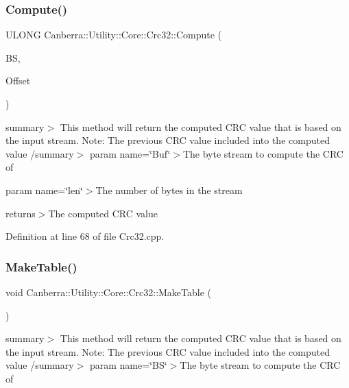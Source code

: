 \subsubsection{\texorpdfstring{Compute()}{Compute()}}
{\footnotesize\ttfamily U\+L\+O\+NG Canberra\+::\+Utility\+::\+Core\+::\+Crc32\+::\+Compute (\begin{DoxyParamCaption}\item[{const \hyperlink{class_canberra_1_1_utility_1_1_core_1_1_byte_stream}{Byte\+Stream} \&}]{BS,  }\item[{L\+O\+NG}]{Offset }\end{DoxyParamCaption})\hspace{0.3cm}{\ttfamily [static]}}

summary$>$ This method will return the computed C\+RC value that is based on the input stream. Note\+: The previous C\+RC value included into the computed value /summary$>$ param name=\char`\"{}\+Buf\char`\"{}$>$The byte stream to compute the C\+RC of 

param name=\char`\"{}len\char`\"{}$>$The number of bytes in the stream 

returns$>$The computed C\+RC value

Definition at line 68 of file Crc32.\+cpp.

\mbox{\label{class_canberra_1_1_utility_1_1_core_1_1_crc32_afab8e77da81f093171fecbeb0a7db492_afab8e77da81f093171fecbeb0a7db492}} 
\subsubsection{\texorpdfstring{Make\+Table()}{MakeTable()}}
{\footnotesize\ttfamily void Canberra\+::\+Utility\+::\+Core\+::\+Crc32\+::\+Make\+Table (\begin{DoxyParamCaption}\item[{void}]{ }\end{DoxyParamCaption})\hspace{0.3cm}{\ttfamily [protected]}}

summary$>$ This method will return the computed C\+RC value that is based on the input stream. Note\+: The previous C\+RC value included into the computed value /summary$>$ param name=\char`\"{}\+B\+S\char`\"{}$>$The byte stream to compute the C\+RC of 

